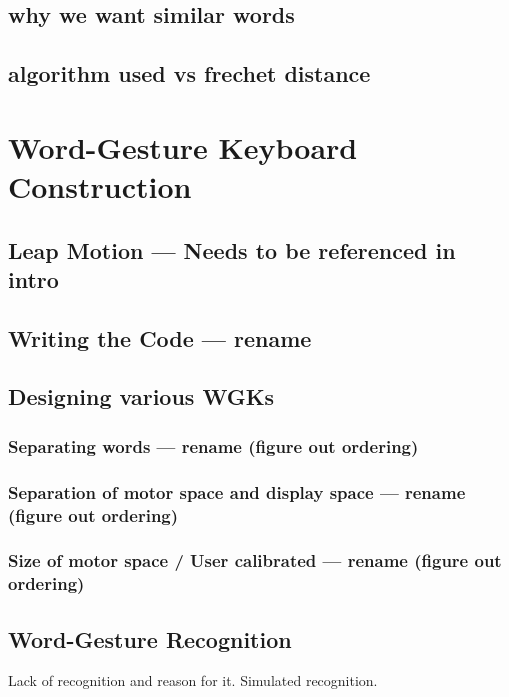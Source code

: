 \subsection{why we want similar words}

\subsection {algorithm used vs frechet distance}

\section{Word-Gesture Keyboard Construction}

\subsection{Leap Motion --- Needs to be referenced in intro}

\subsection{Writing the Code --- rename}

\subsection{Designing various WGKs}

\subsubsection{Separating words --- rename (figure out ordering)}

\subsubsection{Separation of motor space and display space --- rename (figure out ordering)}

\subsubsection{Size of motor space / User calibrated --- rename (figure out ordering)}

\subsection{Word-Gesture Recognition}

Lack of recognition and reason for it. Simulated recognition.

